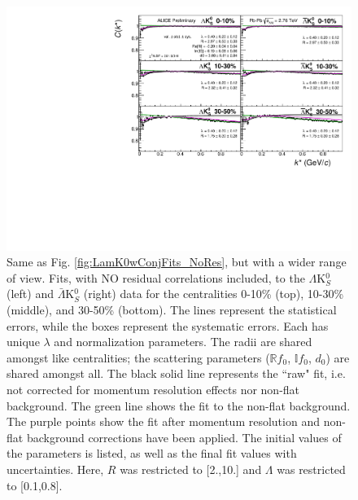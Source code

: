 \documentclass[../AnalysisNoteJBuxton.tex]{subfiles}
\begin{document}
\begin{figure}[h]
  \centering
  \includegraphics[width=\textwidth]{7_ResultsAndDiscussion/Figures/canKStarCfwFitsLamK0wConj_0010_1030_3050UnZoomed_MomResCrctn_NonFlatBgdCrctn_SingleLamParam_NoRes.pdf}
  \caption[$\Lambda$K$^{0}_{S}$($\bar{\Lambda}$K$^{0}_{S}$) Fits with No Residuals (Wide Range)]{Same as Fig. \ref{fig:LamK0wConjFits_NoRes}, but with a wider range of view.  
Fits, with NO residual correlations included, to the $\Lambda$K$^{0}_{S}$ (left) and $\bar{\Lambda}$K$^{0}_{S}$ (right) data for the centralities 0-10\% (top), 10-30\% (middle), and 30-50\% (bottom).
The lines represent the statistical errors, while the boxes represent the systematic errors.
Each has unique $\lambda$ and normalization parameters.
The radii are shared amongst like centralities; the scattering parameters ($\mathbb{R}f_{0}$, $\mathbb{I}f_{0}$, $d_{0}$) are shared amongst all.
The black solid line represents the ``raw" fit, i.e. not corrected for momentum resolution effects nor non-flat background.  
The green line shows the fit to the non-flat background.
The purple points show the fit after momentum resolution and non-flat background corrections have been applied.
The initial values of the parameters is listed, as well as the final fit values with uncertainties.
Here, $R$ was restricted to [2.,10.] and $\Lambda$ was restricted to [0.1,0.8].}
  \label{fig:LamK0wConjFitsUnZoomed_NoRes}
\end{figure}
\end{document}
